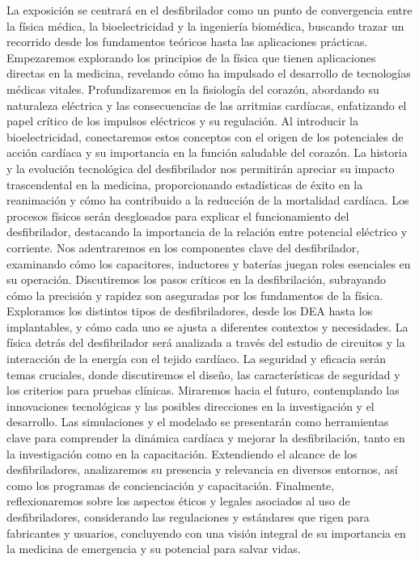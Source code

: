 La exposición se centrará en el desfibrilador como un punto de convergencia entre la física médica, la bioelectricidad y la ingeniería biomédica, buscando trazar un recorrido desde los fundamentos teóricos hasta las aplicaciones prácticas. Empezaremos explorando los principios de la física que tienen aplicaciones directas en la medicina, revelando cómo ha impulsado el desarrollo de tecnologías médicas vitales.
\newline
Profundizaremos en la fisiología del corazón, abordando su naturaleza eléctrica y las consecuencias de las arritmias cardíacas, enfatizando el papel crítico de los impulsos eléctricos y su regulación. Al introducir la bioelectricidad, conectaremos estos conceptos con el origen de los potenciales de acción cardíaca y su importancia en la función saludable del corazón.\newline
La historia y la evolución tecnológica del desfibrilador nos permitirán apreciar su impacto trascendental en la medicina, proporcionando estadísticas de éxito en la reanimación y cómo ha contribuido a la reducción de la mortalidad cardíaca. Los procesos físicos serán desglosados para explicar el funcionamiento del desfibrilador, destacando la importancia de la relación entre potencial eléctrico y corriente. \newline \hfill \break
Nos adentraremos en los componentes clave del desfibrilador, examinando cómo los capacitores, inductores y baterías juegan roles esenciales en su operación. Discutiremos los pasos críticos en la desfibrilación, subrayando cómo la precisión y rapidez son aseguradas por los fundamentos de la física. \newline \hfill \break
Exploramos los distintos tipos de desfibriladores, desde los DEA hasta los implantables, y cómo cada uno se ajusta a diferentes contextos y necesidades. La física detrás del desfibrilador será analizada a través del estudio de circuitos y la interacción de la energía con el tejido cardíaco. \newline \hfill \break
La seguridad y eficacia serán temas cruciales, donde discutiremos el diseño, las características de seguridad y los criterios para pruebas clínicas. Miraremos hacia el futuro, contemplando las innovaciones tecnológicas y las posibles direcciones en la investigación y el desarrollo. \newline \hfill \break
Las simulaciones y el modelado se presentarán como herramientas clave para comprender la dinámica cardíaca y mejorar la desfibrilación, tanto en la investigación como en la capacitación. Extendiendo el alcance de los desfibriladores, analizaremos su presencia y relevancia en diversos entornos, así como los programas de concienciación y capacitación. \newline \hfill \break
Finalmente, reflexionaremos sobre los aspectos éticos y legales asociados al uso de desfibriladores, considerando las regulaciones y estándares que rigen para fabricantes y usuarios, concluyendo con una visión integral de su importancia en la medicina de emergencia y su potencial para salvar vidas.

